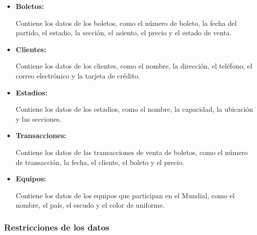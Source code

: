 \begin{itemize}
    \item \textbf{Boletos:}
    
        Contiene los datos de los boletos, como el número de boleto, la fecha del partido,
        el estadio, la sección, el asiento, el precio y el estado de venta.

    \item \textbf{Clientes:}
    
        Contiene los datos de los clientes, como el nombre, la dirección, el teléfono, el correo electrónico y la tarjeta de crédito.

    \item \textbf{Estadios:}
    
        Contiene los datos de los estadios, como el nombre, la capacidad, la ubicación y las secciones.
    
    \item \textbf{Transacciones:} 
    
        Contiene los datos de las transacciones de venta de boletos, como el número de transacción, la fecha, el cliente, el boleto y el precio.

    \item \textbf{Equipos:} 
    
        Contiene los datos de los equipos que participan en el Mundial, como el nombre, el país, el escudo y el color de uniforme.    
\end{itemize}

\subsubsection*{Restricciones de los datos}

